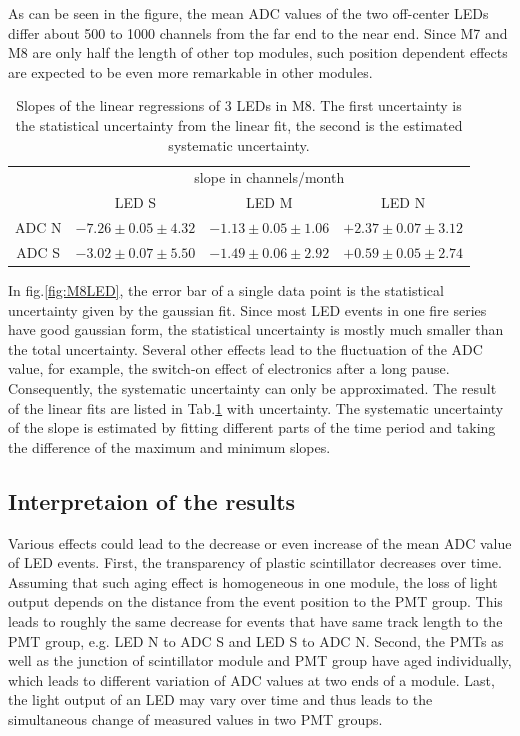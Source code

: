 As can be seen in the figure, the mean ADC values of the two off-center LEDs differ about 500 to 1000 channels from the far end to the near end. Since M7 and M8 are only half the length of other top modules, such position dependent effects are expected to be even more remarkable in other modules.

\begin{table}[hb]
  \centering
  \caption{Slopes of the linear regressions of 3 LEDs in M8. The first uncertainty is the statistical uncertainty from the linear fit, the second is the estimated systematic uncertainty. }
  \label{tab:led}
  \begin{tabular}{c c c c}
  \toprule
        & \multicolumn{3}{c}{slope in channels/month} \\
        & LED S   & LED M  & LED N \\
  \midrule
  ADC N & $-7.26\pm0.05\pm4.32$ & $-1.13\pm0.05\pm1.06$ & $+2.37\pm0.07\pm3.12$  \\
  ADC S & $-3.02\pm0.07\pm5.50$ & $-1.49\pm0.06\pm2.92$ & $+0.59\pm0.05\pm2.74$  \\
  \bottomrule
  \end{tabular}

\end{table}

In fig.\ref{fig:M8LED}, the error bar of a single data point is the statistical uncertainty given by the gaussian fit. Since most LED events in one fire series have good gaussian form, the statistical uncertainty is mostly much smaller than the total uncertainty. Several other effects lead to the fluctuation of the ADC value, for example, the switch-on effect of electronics after a long pause. Consequently, the systematic uncertainty can only be approximated. The result of the linear fits are listed in Tab.\ref{tab:led} with uncertainty. The systematic uncertainty of the slope is estimated by fitting different parts of the time period and taking the difference of the maximum and minimum slopes.

\subsection{Interpretaion of the results}


Various effects could lead to the decrease or even increase of the mean ADC value of LED events. First, the transparency of plastic scintillator decreases over time. Assuming that such aging effect is homogeneous in one module, the loss of light output depends on the distance from the event position to the PMT group. This leads to roughly the same decrease for events that have same track length to the PMT group, e.g. LED N to ADC S and LED S to ADC N. Second, the PMTs as well as the junction of scintillator module and PMT group have aged individually, which leads to different variation of ADC values at two ends of a module. Last, the light output of an LED may vary over time and thus leads to the simultaneous change of measured values in two PMT groups.

